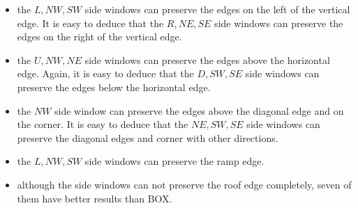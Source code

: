 \documentclass[10pt,twocolumn,letterpaper]{article}
\begin{document}
\begin{itemize}
	\item the $L, NW, SW$ side windows can preserve the edges on the left of the vertical edge. It is easy to deduce that the $R, NE, SE$ side windows can preserve the edges on the right of the vertical edge.
	\item the $U, NW, NE$ side windows can preserve the edges above the horizontal edge. Again, it is easy to deduce that the $D, SW, SE$ side windows can preserve the edges below the horizontal edge.
	\item the $NW$ side window can preserve the edges above the diagonal edge and on the corner. It is easy to deduce that the $NE, SW, SE$ side windows can preserve the diagonal edges and corner with other directions.
	\item the $L, NW, SW$ side windows can preserve the ramp edge.
	\item although the side windows can not preserve the roof edge completely, seven of them have better results than BOX.
\end{itemize}
\end{document}
